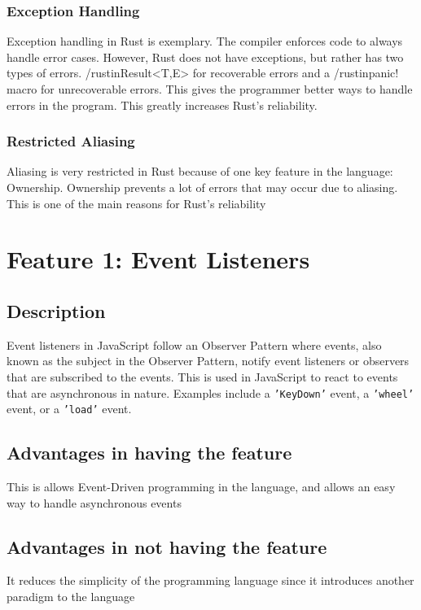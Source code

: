 \documentclass{article}
\newcommand{\jsin}[1]{\texttt{#1}}
\begin{document}
  \subsubsection{Exception Handling}
  Exception handling in Rust is exemplary. The compiler enforces code to always
  handle error cases. However, Rust does not have exceptions, but rather has two
  types of errors. /rustin{Result<T,E>} for recoverable errors and a
  /rustin{panic!} macro for unrecoverable errors. This gives the programmer
  better ways to handle errors in the program. This greatly increases Rust's
  reliability.

  \subsubsection{Restricted Aliasing}
  Aliasing is very restricted in Rust because of one key feature in the
  language: Ownership. Ownership prevents a lot of errors that may occur due to
  aliasing. This is one of the main reasons for Rust's reliability

  \section{Feature 1: Event Listeners}
  \subsection{Description}
  Event listeners in JavaScript follow an Observer Pattern where events, also
  known as the subject in the Observer Pattern, notify event listeners or
  observers that are subscribed to the events. This is used in JavaScript to
  react to events that are asynchronous in nature. Examples include a
  \jsin{'KeyDown'} event, a \jsin{'wheel'} event, or a \jsin{'load'} event.

  \subsection{Advantages in having the feature}
  This is allows Event-Driven programming in the language, and allows an easy
  way to handle asynchronous events

  \subsection{Advantages in not having the feature}
  It reduces the simplicity of the programming language since it introduces
  another paradigm to the language
\end{document}

